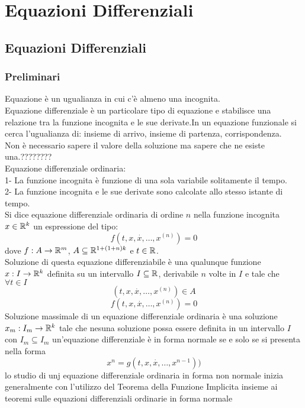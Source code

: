 \part{Equazioni Differenziali}
\chapter{Equazioni Differenziali}
\section{Preliminari}
Equazione è un ugualianza in cui c'è almeno una incognita.\\
Equazione differenziale è un particolare tipo di equazione e stabilisce una relazione tra la funzione incognita e le sue derivate.In un equazione funzionale si cerca l'ugualianza di: insieme di arrivo, insieme di partenza, corrispondenza.\\
Non è necessario sapere il valore della soluzione ma sapere che ne esiste una.????????\\
Equazione differenziale ordinaria:\\
1- La funzione incognita è funzione di una sola variabile solitamente il tempo.\\
2- La funzione incognita e le sue derivate sono calcolate allo stesso istante di tempo.\\
Si dice equazione differenziale ordinaria di ordine $n$ nella funzione incognita $x\in \mathbb{R}^k$ un espressione del tipo:\\
$$f(t,x,\overset{\cdot}{x},\ldots,x^{(n)})=0$$
dove $f:A\to \mathbb{R}^m$, $A\subseteq \mathbb{R}^{1+(1+n)k}$ e $t\in \mathbb{R}$.\\
Soluzione di questa equazione differenziabile è una qualunque funzione $x:I\to \mathbb{R}^k$ definita su un intervallo $I\subseteq \mathbb{R}$, derivabile $n$ volte in $I$ e tale che $\forall t\in I$\\
$$ (t,x,\overset{\cdot}{x},\ldots,x^{(n)}) \in A$$
$$ f(t,x,\overset{\cdot}{x},\ldots,x^{(n)})=0$$
Soluzione massimale  di un equazione differenziale ordinaria è una soluzione $x_m:I_m\to \mathbb{R}^k$ tale che nesuna soluzione possa essere definita in un intervallo $I$ con $I_m\subseteq I_m$
un'equazione differenziale è in forma normale  se e solo se si presenta nella forma 
$$x^n = g(t,x,\overset{\cdot}{x},\ldots,x^{n-1}))$$
\observation
lo studio di unj equazione differenziale ordinaria in forma non normale inizia generalmente con l'utilizzo del Teorema della Funzione Implicita insieme ai teoremi sulle equazioni differenziali ordinarie in forma normale
